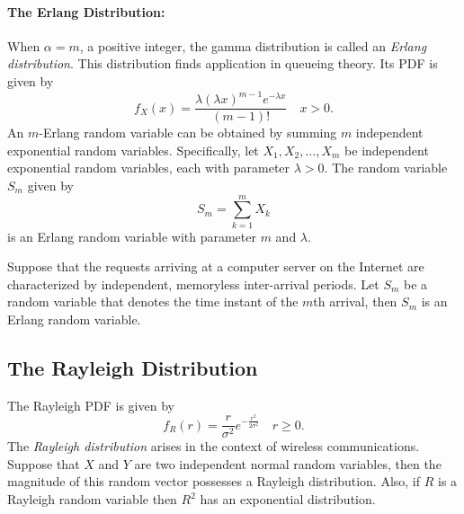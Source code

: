 \paragraph{The Erlang Distribution:}
When $\alpha = m$, a positive integer, the gamma distribution is called an \emph{Erlang distribution}.
This distribution finds application in queueing theory.
Its PDF is given by
\begin{equation*}
f_X (x) = \frac{\lambda (\lambda x)^{m - 1} e^{-\lambda x}}{(m-1)!} \quad  x > 0.
\end{equation*}
An $m$-Erlang random variable can be obtained by summing $m$ independent exponential random variables.
Specifically, let $X_1, X_2, \ldots, X_m$ be independent exponential random variables, each with parameter $\lambda > 0$.
The random variable $S_m$ given by
\begin{equation*}
S_m = \sum_{k=1}^m X_k
\end{equation*}
is an Erlang random variable with parameter $m$ and $\lambda$.

\begin{example}
Suppose that the requests arriving at a computer server on the Internet are characterized by independent, memoryless inter-arrival periods.
Let $S_m$ be a random variable that denotes the time instant of the $m$th arrival, then $S_m$ is an Erlang  random variable.
\end{example}


\subsection{The Rayleigh Distribution}

The Rayleigh PDF is given by 
\begin{equation*}
f_R (r) = \frac{r}{\sigma^2} e^{- \frac{r^2}{2 \sigma^2} } \quad r \geq 0 .
\end{equation*}
The \emph{Rayleigh distribution} arises in the context of wireless communications.
Suppose that $X$ and $Y$ are two independent normal random variables, then the magnitude of this random vector possesses a Rayleigh distribution.
Also, if $R$ is a Rayleigh random variable then $R^2$ has an exponential distribution.

